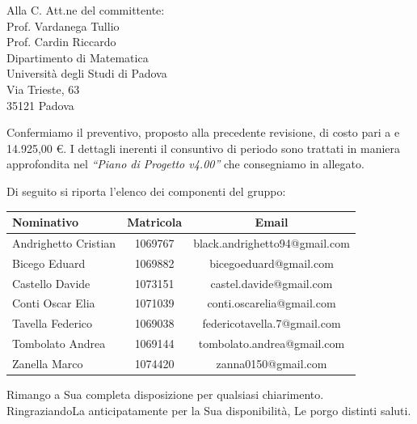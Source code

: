 \documentclass[a4paper,12pt]{letteracdp}
\begin{document}
\begin{letter}{
		Alla C. Att.ne del committente: \\
		Prof. Vardanega Tullio \\
		Prof. Cardin Riccardo \\
		Dipartimento di Matematica \\
		Università degli Studi di Padova \\
		Via Trieste, 63 \\
		35121 Padova}
\begin{itemize}
\end{itemize}

Confermiamo il preventivo, proposto alla precedente revisione, di costo pari a e 14.925,00 \euro. I dettagli inerenti il consuntivo di periodo sono trattati in maniera approfondita nel \textit{``Piano di Progetto v4.00''} che consegniamo in allegato.

\newpage
Di seguito si riporta l'elenco dei componenti del gruppo:

\begin{center}
		\begin{tabular}{l c c}
			\toprule
			\textbf{Nominativo} & \textbf{Matricola} & \textbf{Email} \\
			\midrule
			Andrighetto Cristian & 1069767 & black.andrighetto94@gmail.com \\
			Bicego Eduard & 1069882 & bicegoeduard@gmail.com  \\
			Castello Davide	& 1073151 &	 castel.davide@gmail.com\\
			Conti Oscar Elia & 1071039 & conti.oscarelia@gmail.com \\
			Tavella Federico & 1069038 & federicotavella.7@gmail.com\\
			Tombolato Andrea & 1069144 & tombolato.andrea@gmail.com	 \\
			Zanella Marco & 1074420 & zanna0150@gmail.com \\
			\bottomrule
		\end{tabular}
\end{center}
		
		\closing{Rimango a Sua completa disposizione per qualsiasi chiarimento. \\
		RingraziandoLa anticipatamente per la Sua disponibilità, Le porgo distinti saluti.}
		
	\end{letter}
\end{document}
